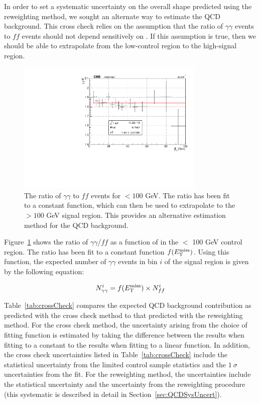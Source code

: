 In order to set a systematic uncertainty on the overall \ETmiss shape predicted using the \diempt reweighting method, we sought an alternate way to estimate the QCD background. This cross check relies on the assumption that the ratio of $\gamma\gamma$ events to $ff$ events should not depend sensitively on \ETmiss. If this assumption is true, then we should be able to extrapolate from the low-\ETmiss control region to the high-\ETmiss signal region.

\begin{figure}[h]
\begin{center}
\includegraphics[width=0.8\textwidth]{Figures/DataAnalysis/crossCheckFit.pdf}
\end{center}
\caption{The ratio of $\gamma\gamma$ to $ff$ events for \ETmiss$ < 100$ GeV. 
The ratio has been fit to a constant function, which can then be used to 
extrapolate to the \ETmiss$ >100$ GeV signal region. 
This provides an alternative estimation method for the QCD background.}
\label{fig:crossCheck}
\end{figure}

Figure~\ref{fig:crossCheck} shows the ratio of $\gamma\gamma$/$ff$ as a function of \ETmiss in the \ETmiss $<$ 100 GeV control region. The ratio has been fit to a constant function $f(E_{\mathrm{T}}^{\text{miss}})$. Using this function, the expected number of $\gamma\gamma$ events in bin $i$ of the signal region is given by the following equation:

\begin{equation}
N_{\gamma\gamma}^i = f(E_{\mathrm{T}}^{\text{miss}}) \times N_{ff}^i 
\end{equation}

Table~\ref{tab:crossCheck} compares the expected QCD background contribution as predicted with the cross check method to that predicted with the \diempt reweighting method. For the cross check method, the uncertainty arising from the choice of fitting function is estimated by taking the difference between the results when fitting to a constant to the results when fitting to a linear function. In addition, the cross check uncertainties listed in Table~\ref{tab:crossCheck} include the statistical uncertainty from the limited control sample statistics and the $1~\sigma$ uncertainties from the fit. For the \diempt reweighting method, the uncertainties include the statistical uncertainty and the uncertainty from the \diempt reweighting procedure (this systematic is described in detail in Section~\ref{sec:QCDSysUncert}). 

